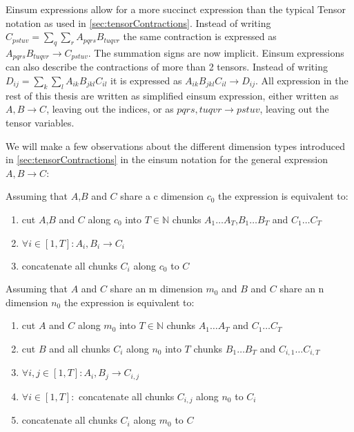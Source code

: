 Einsum expressions allow for a more succinct expression than the typical Tensor notation as used in \ref{sec:tensorContractions}.
Instead of writing $C_{pstuv}=\sum_{q}\sum_{r}A_{pqrs}B_{tuqvr}$ the same contraction is expressed as $A_{pqrs}B_{tuqvr} \rightarrow C_{pstuv}$.
The summation signs are now implicit.
Einsum expressions can also describe the contractions of more than 2 tensors\cite{einsum_is_all_you_need}.
Instead of writing $D_{ij} = \sum_{k}\sum_{l}A_{ik}B_{jkl}C_{il}$ it is expressed as $A_{ik}B_{jkl}C_{il} \rightarrow D_{ij}$.
All expression in the rest of this thesis are written as simplified einsum expression, either written as $A,B\rightarrow C$, leaving out the indices, or as $pqrs,tuqvr \rightarrow pstuv$, leaving out the tensor variables.

We will make a few observations about the different dimension types introduced in \ref{sec:tensorContractions} in the einsum notation for the general expression $A,B \rightarrow C$:

Assuming that $A$,$B$ and $C$ share a c dimension $c_0$ the expression is equivalent to:
\begin{enumerate}
  \item cut $A$,$B$ and $C$ along $c_0$ into $T \in \mathbb{N}$ chunks $A_1 \dots A_T$,$B_1 \dots B_T$ and $C_1 \dots C_T$
  \item $\forall i \in [1,T]: A_i, B_i \rightarrow C_i$
  \item concatenate all chunks $C_i$ along $c_0$ to $C$
\end{enumerate}

Assuming that $A$ and $C$ share an m dimension $m_0$ and $B$ and $C$ share an n dimension $n_0$ the expression is equivalent to:
\begin{enumerate}
  \item cut $A$ and $C$ along $m_0$ into $T \in \mathbb{N}$ chunks $A_1 \dots A_T$ and $C_1 \dots C_T$
  \item cut $B$ and all chunks $C_i$ along $n_0$ into $T$ chunks $B_1 \dots B_T$ and $C_{i,1} \dots C_{i,T}$
  \item $\forall i,j \in [1,T]: A_i, B_j \rightarrow C_{i,j}$
  \item $\forall i \in [1,T]:$ concatenate all chunks $C_{i,j}$ along $n_0$ to $C_i$
  \item concatenate all chunks $C_i$ along $m_0$ to $C$
\end{enumerate}

